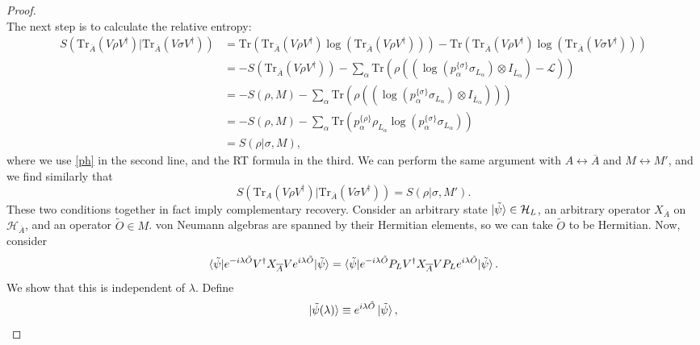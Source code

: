 \documentclass[12pt,a4paper]{report}
\numberwithin{equation}{section}
\newcommand{\ol}[1]{\overline{#1}}
\newcommand{\tr}{\text{Tr}}
\theoremstyle{definition}
\theoremstyle{theorem}
\theoremstyle{theorem}
\theoremstyle{example}
\theoremstyle{definition}
\begin{document}
\begin{proof}
\begin{equation}
	\end{equation}
	The next step is to calculate the relative entropy:
	\begin{equation}
		\begin{aligned}
			S\left(\tr_{\ol{A}}\left(V\rho V^{\dagger}\right)|\tr_{\ol{A}}\left(V\sigma V^{\dagger}\right)\right)&=\tr\left(\tr_{\ol{A}}\left(V\rho V^{\dagger}\right)\log\left(\tr_{\ol{A}}\left(V\rho V^{\dagger}\right)\right)\right)-\tr\left(\tr_{\ol{A}}\left(V\rho V^{\dagger}\right)\log\left(\tr_{\ol{A}}\left(V\sigma V^{\dagger}\right)\right)\right)\\&=-S\left(\tr_{\ol{A}}\left(V\rho V^{\dagger}\right)\right)-\sum_{\alpha}\tr\left(\rho\left(\left(\log\left(p_{\alpha}^{\{\sigma\}}\sigma_{L_{\alpha}}\right)\otimes I_{\ol{L}_{\alpha}}\right)-\mathcal{L}\right)\right)\\&=-S(\rho,M)-\sum_{\alpha}\tr\left(\rho\left(\left(\log\left(p_{\alpha}^{\{\sigma\}}\sigma_{L_{\alpha}}\right)\otimes I_{\ol{L}_{\alpha}}\right)\right)\right)\\&=-S(\rho,M)-\sum_{\alpha}\tr\left(p_{\alpha}^{\{\rho\}}\rho_{L_{\alpha}}\log\left(p_{\alpha}^{\{\sigma\}}\sigma_{L_{\alpha}}\right)\right)\\&=S(\rho|\sigma,M),
		\end{aligned}
	\end{equation}
	where we use \ref{ph} in the second line, and the RT formula in the third. We can perform the same argument with ${A}\leftrightarrow \ol{A}$ and $M\leftrightarrow M'$, and we find similarly that
	\begin{equation}\label{asd}
		S(\tr_{{A}}(V\rho V^{\dagger})|\tr_{\ol{A}}(V\sigma V^{\dagger}))=S(\rho|\sigma,M').
	\end{equation}
	These two conditions together in fact imply complementary recovery. Consider an arbitrary state $\ket{\tilde{\psi}}\in\mathcal{H}_{L}$, an arbitrary operator $X_{\ol{A}}$ on $\mathcal{H}_{\ol{A}}$, and an operator $\tilde{O}\in M$. von Neumann algebras are spanned by their Hermitian elements, so we can take $\tilde{O}$ to be Hermitian. Now, consider
	\begin{equation}\label{asd1}
		\braket{\tilde{\psi}|e^{-i\lambda\tilde{O}}V^{\dagger}X_{\ol{A}}Ve^{i\lambda\tilde{O}}|\tilde{\psi}}=\braket{\tilde{\psi}|e^{-i\lambda\tilde{O}}P_{L}V^{\dagger}X_{\ol{A}}VP_{L}e^{i\lambda\tilde{O}}|\tilde{\psi}}.
	\end{equation}
	We show that this is independent of $\lambda$. Define
	\begin{equation}
		\ket{\tilde{\psi}(\lambda)}\equiv e^{i\lambda\tilde{O}}\ket{\tilde{\psi}},

\end{equation}
\end{proof}
\end{document}
